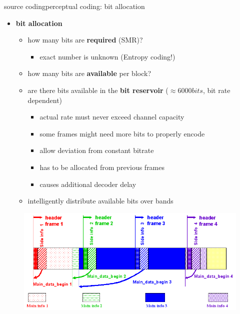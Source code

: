 	\begin{frame}{source coding}{perceptual coding: bit allocation}
		\begin{itemize}
			\item	\textbf{bit allocation}
				\begin{itemize}
                    \item   how many bits are \textbf{required} (SMR)?
                        \begin{itemize}
                            \item   exact number is unknown (Entropy coding!)
                        \end{itemize}
					\item	how many bits are \textbf{available} per block?
					\item	are there bits available in the \textbf{bit reservoir} ($\approx 6000 bits$, bit rate dependent)
                        \begin{itemize}
                            \item   actual rate must never exceed channel capacity
                            \item   some frames might need more bits to properly encode
                            \item   allow deviation from constant bitrate 
                            \item   has to be allocated from previous frames 
                            \item   causes additional decoder delay
                        \end{itemize}
					\item	intelligently distribute available bits over bands 
				\end{itemize}
		\end{itemize}
        \begin{figure}
            \includegraphics[scale=.2]{graph/bit_reservoir}
        \end{figure}
	\end{frame}
	
